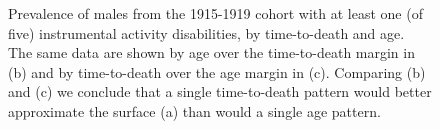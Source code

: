 \documentclass[11pt,oneside,a4paper]{article} %
\begin{document}
\begin{figure}[ht!]
    \caption{Prevalence of males from the 1915-1919 cohort with at least one (of
	five) instrumental activity disabilities, by time-to-death and age. The same data are shown by age over the time-to-death margin in (b) and by time-to-death over the age margin in (c). Comparing (b) and (c) we conclude that a single time-to-death pattern would better approximate the surface (a) than would a single age pattern.}\label{fig:IADL_ATL}
\end{figure}
\end{document}
